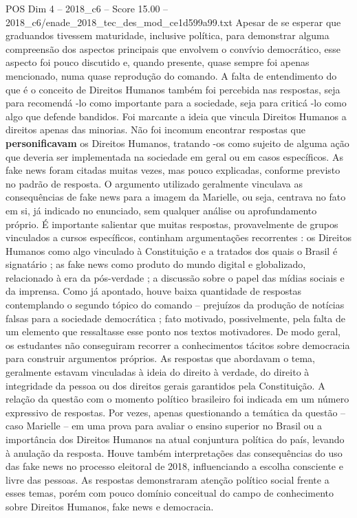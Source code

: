 \begin{textsample}{POS Dim 4 – 2018\_c6 – Score 15.00 – 2018\_c6/enade\_2018\_tec\_des\_mod\_ce1d599a99.txt}
Apesar de se esperar que graduandos tivessem maturidade, inclusive política, para demonstrar alguma compreensão dos aspectos principais que envolvem o convívio democrático, esse aspecto foi pouco discutido e, quando presente, quase sempre foi apenas mencionado, numa quase reprodução do comando.
A falta de entendimento do que é o conceito de Direitos Humanos também foi percebida nas respostas, seja para recomendá -lo como importante para a sociedade, seja para criticá -lo como algo que defende bandidos.
Foi marcante a ideia que vincula Direitos Humanos a direitos apenas das minorias.
Não foi incomum encontrar respostas que \textbf{personificavam} os Direitos Humanos, tratando -os como sujeito de alguma ação que deveria ser implementada na sociedade em geral ou em casos específicos.
As fake news foram citadas muitas vezes, mas pouco explicadas, conforme previsto no padrão de resposta.
O argumento utilizado geralmente vinculava as consequências de fake news para a imagem da Marielle, ou seja, centrava no fato em si, já indicado no enunciado, sem qualquer análise ou aprofundamento próprio.
É importante salientar que muitas respostas, provavelmente de grupos vinculados a cursos específicos, continham argumentações recorrentes : os Direitos Humanos como algo vinculado à Constituição e a tratados dos quais o Brasil é signatário ; as fake news como produto do mundo digital e globalizado, relacionado à era da pós-verdade ; a discussão sobre o papel das mídias sociais e da imprensa.
Como já apontado, houve baixa quantidade de respostas contemplando o segundo tópico do comando – prejuízos da produção de notícias falsas para a sociedade democrática ; fato motivado, possivelmente, pela falta de um elemento que ressaltasse esse ponto nos textos motivadores.
De modo geral, os estudantes não conseguiram recorrer a conhecimentos tácitos sobre democracia para construir argumentos próprios.
As respostas que abordavam o tema, geralmente estavam vinculadas à ideia do direito à verdade, do direito à integridade da pessoa ou dos direitos gerais garantidos pela Constituição.
A relação da questão com o momento político brasileiro foi indicada em um número expressivo de respostas.
Por vezes, apenas questionando a temática da questão – caso Marielle – em uma prova para avaliar o ensino superior no Brasil ou a importância dos Direitos Humanos na atual conjuntura política do país, levando à anulação da resposta.
Houve também interpretações das consequências do uso das fake news no processo eleitoral de 2018, influenciando a escolha consciente e livre das pessoas.
As respostas demonstraram atenção político social frente a esses temas, porém com pouco domínio conceitual do campo de conhecimento sobre Direitos Humanos, fake news e democracia.

\end{textsample}
